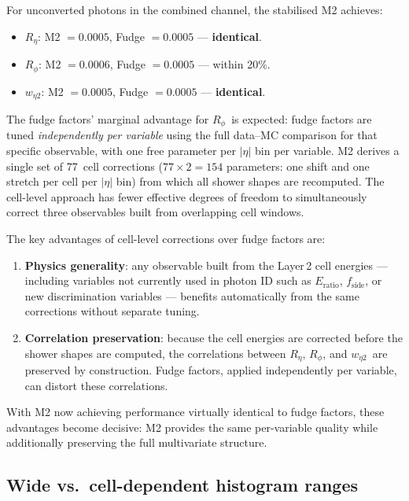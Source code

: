 \documentclass[11pt,a4paper]{article}
\newcommand{\Reta}{\ensuremath{R_{\eta}}}
\newcommand{\Rphi}{\ensuremath{R_{\phi}}}
\newcommand{\weta}{\ensuremath{w_{\eta 2}}}
\newcommand{\abseta}{\ensuremath{|\eta|}}
\begin{document}
For unconverted photons in the combined channel, the stabilised M2
achieves:
\begin{itemize}
  \item \Reta: M2 $= 0.0005$, Fudge $= 0.0005$ --- \textbf{identical}.
  \item \Rphi: M2 $= 0.0006$, Fudge $= 0.0005$ --- within 20\%.
  \item \weta: M2 $= 0.0005$, Fudge $= 0.0005$ --- \textbf{identical}.
\end{itemize}

The fudge factors' marginal advantage for \Rphi\ is expected: fudge
factors are tuned \emph{independently per variable} using the full
data--MC comparison for that specific observable, with one free parameter
per $\abseta$ bin per variable.  M2 derives a single set of 77~cell
corrections ($77 \times 2 = 154$ parameters: one shift and one stretch
per cell per $\abseta$ bin) from which all shower shapes are recomputed.
The cell-level approach has fewer effective degrees of freedom to
simultaneously correct three observables built from overlapping cell
windows.

The key advantages of cell-level corrections over fudge factors are:
\begin{enumerate}
  \item \textbf{Physics generality}: any observable built from the
        Layer\,2 cell energies --- including variables not currently
        used in photon ID such as $E_{\text{ratio}}$,
        $f_{\text{side}}$, or new discrimination variables ---
        benefits automatically from the same corrections without
        separate tuning.
  \item \textbf{Correlation preservation}: because the cell energies
        are corrected before the shower shapes are computed, the
        correlations between \Reta, \Rphi, and \weta\ are preserved
        by construction.  Fudge factors, applied independently per
        variable, can distort these correlations.
\end{enumerate}

With M2 now achieving performance virtually identical to fudge factors,
these advantages become decisive: M2 provides the same per-variable
quality while additionally preserving the full multivariate structure.


\subsection{Wide vs.\ cell-dependent histogram ranges}
\label{sec:disc-wide-vs-cellrange}
\end{document}
